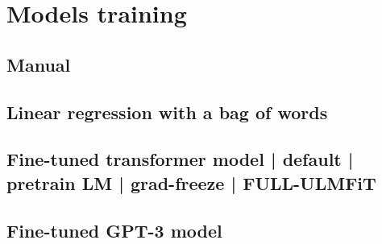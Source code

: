 \chapter{Models training}

\section{Manual}
\section{Linear regression with a bag of words}
\section{Fine-tuned transformer model | default | pretrain LM | grad-freeze | FULL-ULMFiT}
\section{Fine-tuned GPT-3 model}
